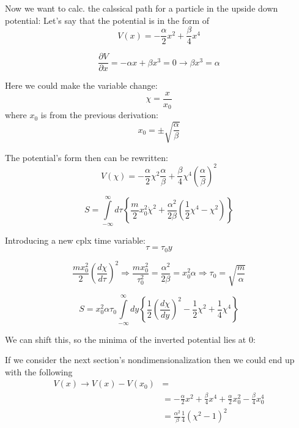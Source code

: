 \documentclass[12pt,a4paper]{article}
\numberwithin{equation}{section}
\begin{document}
Now we want to calc. the calssical path for a particle in the upside down potential:
Let's say that the potential is in the form of 
\begin{equation}
V(x) = -\frac{\alpha}{2}x^2 + \frac{\beta}{4}x^4
\end{equation}

\begin{equation}
\frac{\partial V}{\partial x} = -\alpha x + \beta x^3 = 0 \rightarrow \beta x^3 = \alpha
\end{equation}

Here we could make the variable change:
\begin{equation}
\chi = \frac{x}{x_0}
\end{equation}
 where $x_0$ is from the previous derivation:
 \begin{equation}
 x_0 = \pm \sqrt{\frac{\alpha}{\beta}}
 \end{equation}

The potential's form then can be rewritten:
\begin{equation}
V(\chi) = -\frac{\alpha}{2}\chi^2 \frac{\alpha}{\beta} + \frac{\beta}{4}\chi^4 \left( \frac{\alpha}{\beta}\right)^2
\end{equation}

\begin{equation}
S = \int\limits_{-\infty}^\infty d\tau \left\lbrace \frac{m}{2} x_0^2 \dot{\chi}^2 + \frac{\alpha^2}{2\beta} \left( \frac{1}{2} \chi^4 - \chi^2  \right) \right\rbrace
\end{equation}

Introducing a new cplx time variable:
\begin{equation}
\tau = \tau_0 y
\end{equation}

\begin{equation}
\frac{mx_0^2}{2} \left( \frac{d\chi}{d\tau}\right)^2 \Rightarrow \frac{mx_0^2}{\tau_0^2} = \frac{\alpha^2}{2\beta} = x_0^2 \alpha \Rightarrow \tau_0 = \sqrt{\frac{m}{\alpha}}
\end{equation}

\begin{equation}
S = x_0^2 \alpha \tau_0 \int\limits_{-\infty}^\infty dy \left\lbrace \frac{1}{2} \left( \frac{d\chi}{dy}\right)^2 - \frac{1}{2}\chi^2 + \frac{1}{4}\chi^4 \right\rbrace
\end{equation}

We can shift this, so the minima of the inverted potential lies at 0:

If we consider the next section's nondimensionalization then we could end up with the following
\begin{align}
V(x) \rightarrow V(x) - V(x_0) &=\\
&= -\frac{\alpha}{2}x^2 + \frac{\beta}{4}x^4 + \frac{\alpha}{2}x_0^2 - \frac{\beta}{4}x_0^4\\
&= \frac{\alpha^2}{\beta}\frac{1}{4} \left( \chi^2 - 1 \right)^2
\end{align}
\end{document}
